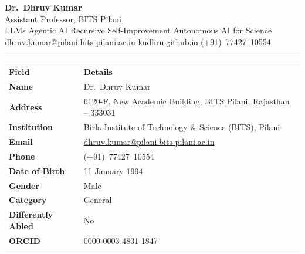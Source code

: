\documentclass[10pt, a4paper]{article}
\newcommand{\cvsectionnn}[1]{%
  \vspace{1.0em}%
  \noindent{\large\bfseries\color{AccentBlue}#1}\par%
  \vspace{-0.5em}%
  {\color{AccentBlue}\rule{\linewidth}{1.5pt}}\par%
  \vspace{0.4em}%
}
\begin{document}
\thispagestyle{fancy}


\vspace{-0.9cm}
\begin{minipage}[t]{\linewidth}
  \color{white}
  {\fontsize{24}{29}\selectfont\bfseries Dr.\ Dhruv Kumar}\\[0.3em]
  {\normalsize Assistant Professor, BITS Pilani}\\[0.22em]
  {\small LLMs \;\textbullet\;
         Agentic AI \;\textbullet\;
         Recursive Self-Improvement \;\textbullet\;
         Autonomous AI for Science}\\[0.5em]
  {\hypersetup{urlcolor=white}\footnotesize
   \href{mailto:dhruv.kumar@pilani.bits-pilani.ac.in}{dhruv.kumar@pilani.bits-pilani.ac.in}
   \;\textbullet\;
   \href{https://kudhru.github.io}{kudhru.github.io}
   \;\textbullet\;
   (+91)\ 77427\ 10554}
\end{minipage}

\vspace{2.8em}

\cvsectionnn{Personal Details}

\renewcommand{\arraystretch}{1.35}
\begin{tabularx}{\linewidth}{L{4.0cm} X}
  \color{white}\textbf{Field} & \color{white}\textbf{Details} \\
  \textbf{Name}               & Dr.\ Dhruv Kumar \\
  \textbf{Address}            & 6120-F, New Academic Building, BITS Pilani, Rajasthan -- 333031 \\
  \textbf{Institution}        & Birla Institute of Technology \& Science (BITS), Pilani \\
  \textbf{Email}              & \href{mailto:dhruv.kumar@pilani.bits-pilani.ac.in}{dhruv.kumar@pilani.bits-pilani.ac.in} \\
  \textbf{Phone}              & (+91)\ 77427\ 10554 \\
  \textbf{Date of Birth}      & 11 January 1994 \\
  \textbf{Gender}             & Male \\
  \textbf{Category}           & General \\
  \textbf{Differently Abled}  & No \\
  \textbf{ORCID}              & 0000-0003-4831-1847 \\
\end{tabularx}
\end{document}
